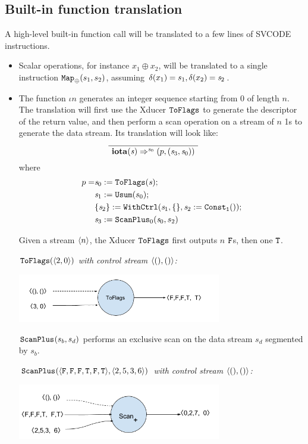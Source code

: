 \subsection{Built-in function translation}
A high-level built-in function call will be translated to a few lines of SVCODE instructions.

\begin{itemize}
	\item Scalar operations, for instance $x_1 \oplus x_2$, will be translated to a single instruction $\map{\oplus}(s_1,s_2)$, assuming $\del(x_1) = s_1, \del(x_2) = \s_2$.
	
	\item The function $\iota{n}$  generates an integer sequence starting from 0 of length $n$.  
	The translation will first use the Xducer $\toflag$ to generate the descriptor of the return value, and then perform a scan operation on a stream of $n$ 1s to generate the data stream.
	Its translation will look like: 
	$$	\PT{
		\Axiom{\Transf{\iotan}{\s}{\s_0}{}{\sfun{p} {(\s_3,\s_0)}}}
	}$$
	where 
	\begin{align*}
			p= & \sdef{\s_0}{\toflag(\s)} ; \\ 
			& \sdef{\s_1}{\usum(s_0)} ; \\
			& \withctrl{\s_1}{\sdef{\s_2}{\consta{1}()}}{\{\}}{\{\s_2\}}; \\
			& \sdef{\s_3}{\scan_{0}(\s_0,s_2)}
		\end{align*}

Given a stream $\singl{n}$, the Xducer $\toflag$ first outputs $n$ $\F$s, then one $\T$.

\begin{example} \emph{$\toflagf{\<2,0\'>}$  with control stream $\<(),()\'>$:}\\
	\begin{center}
		\includegraphics[width=0.7\textwidth]{fig/toflagsxducer.png}
	\end{center}
\end{example}

$\scan_{}(s_b,s_d)$ performs an exclusive scan on the data stream $s_d$ segmented by $s_b$.
\begin{example} \emph{$\scan_{}(\<\F,\F,\F,\T,\F,\T\'>, \< 2,5,3,6 \'>)$  with control stream $\<(),()\'>$: }\\
	\begin{center}
		\includegraphics[width=0.7\textwidth]{fig/scanxducer.png}
	\end{center}
\end{example}




\end{itemize}
